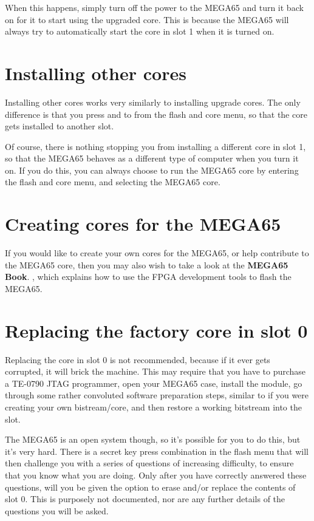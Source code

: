 When this happens, simply turn off the power to the MEGA65 and turn it back on for it to start using the
upgraded core.  This is because the MEGA65 will always try to automatically start the core in slot 1 when
it is turned on.

\section{Installing other cores}

Installing other cores works very similarly to installing upgrade cores. The only difference is that you
press  and  to  from the flash and core menu, so that the core
gets installed to another slot.

Of course, there is nothing stopping you from installing a different core
in slot 1, so that the MEGA65 behaves as a different type of computer when you turn it on.  If you do this,
you can always choose to run the MEGA65 core by entering the flash and core menu,  and selecting the MEGA65
core.

\section{Creating cores for the MEGA65}

If you would like to create your own cores for the MEGA65, or help
contribute to the MEGA65 core, then
you may also wish to take a look at
\ifdefined\printmanual
the {\bf MEGA65 Book}.
\else
{},
\fi
which explains how to use the
FPGA development tools to flash the MEGA65.

\section{Replacing the factory core in slot 0}

Replacing the core in slot 0 is not recommended, because if it ever gets corrupted, it will brick the machine.
This may require that you have to purchase a TE-0790 JTAG programmer, open your MEGA65 case, install
the module, go through some rather convoluted software preparation steps, similar to if you were
creating your own bistream/core, and then restore a working bitstream into the slot.

The MEGA65 is an open system though, so it's possible for you to do this, but it's very hard. There
is a secret key press combination in the flash menu that will then challenge you with a series of questions of
increasing difficulty, to ensure that you know what you are doing.  Only after you have correctly
answered these questions, will you be given the option to erase and/or replace the contents of slot 0.
This is purposely not documented, nor are any further details of the questions you will be asked.

